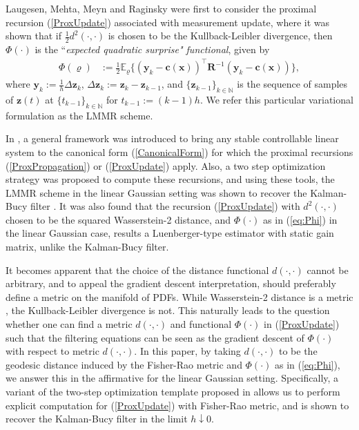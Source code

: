 \documentclass[letterpaper,10pt,twocolumn,conference]{ieeeconf}
\newcommand{\bbc}{\bm{c}}
\newcommand{\bbx}{{\bm{x}}}
\newcommand{\bby}{{\bm{y}}}
\newcommand{\bbz}{\bm{z}}
\newcommand{\bbR}{\bm{R}}
\begin{document}
Laugesen, Mehta, Meyn and Raginsky \cite{LaugesenMehta2015} were first to consider the proximal recursion (\ref{ProxUpdate}) associated with measurement update, where it was shown  that if $\frac{1}{2}d^{2}(\cdot,\cdot)$ is chosen to be the Kullback-Leibler divergence, then $\Phi(\cdot)$ is the ``\emph{expected quadratic surprise" functional}, given by 
\begin{align}\label{eq:Phi}
\Phi(\varrho) &:= \frac12\mathbb{E}_{\varrho}\{(\bby_{k} - \bbc(\bbx))^{\top}\bbR^{-1}(\bby_{k} - \bbc(\bbx))\},
\end{align}
where
$\bby_{k} := \frac{1}{h}\Delta \bbz_{k}$, $\Delta\bbz_{k}:=\bbz_{k} - \bbz_{k-1}$, and 
$\{\bbz_{k-1}\}_{k\in\mathbb{N}}$ is the sequence of samples of $\bbz(t)$ at $\{t_{k-1}\}_{k\in\mathbb{N}}$ for
$t_{k-1} := (k-1)h$. We refer this particular variational formulation as the LMMR scheme.

In \cite{HalderGeorgiouCDC2017}, a general framework was introduced to bring any stable controllable linear system to the canonical form (\ref{CanonicalForm}) for which the proximal recursions (\ref{ProxPropagation}) or (\ref{ProxUpdate}) apply. Also, a two step optimization strategy was proposed to compute these recursions, and using these tools, the LMMR scheme in the linear Gaussian setting was shown to recover the Kalman-Bucy filter \cite{KalmanBucy1961}. It was also found \cite[Section IV.B]{HalderGeorgiouCDC2017} that the recursion (\ref{ProxUpdate}) with $d^{2}(\cdot,\cdot)$ chosen to be the squared Wasserstein-2 distance, and $\Phi(\cdot)$ as in (\ref{eq:Phi}) in the linear Gaussian case, results a Luenberger-type estimator with static gain matrix, unlike the Kalman-Bucy filter.

It becomes apparent that the choice of the distance functional $d(\cdot,\cdot)$ cannot be arbitrary, and to appeal the gradient descent interpretation, should preferably define a metric on the manifold of PDFs. While Wasserstein-2 distance is a metric \cite[p. 208]{VillaniBook}, the Kullback-Leibler divergence is not. This naturally leads to the question whether one can find a metric $d(\cdot,\cdot)$ and functional $\Phi(\cdot)$ in (\ref{ProxUpdate}) such that the filtering equations can be seen as the gradient descent of $\Phi(\cdot)$ with respect to metric $d(\cdot,\cdot)$. In this paper, by taking $d(\cdot,\cdot)$ to be the geodesic distance induced by the Fisher-Rao metric \cite{Rao1945} and $\Phi(\cdot)$ as in (\ref{eq:Phi}), we answer this in the affirmative for the linear Gaussian setting. Specifically, a variant of the two-step optimization template proposed in \cite{HalderGeorgiouCDC2017} allows us to perform explicit computation for (\ref{ProxUpdate}) with Fisher-Rao metric, and is shown to recover the Kalman-Bucy filter in the limit $h\downarrow 0$. 
\end{document}
